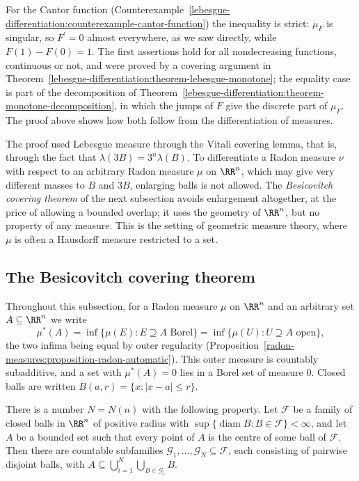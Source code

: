 For the Cantor function (Counterexample~\ref{lebesgue-differentiation:counterexample-cantor-function}) the inequality is strict: $\mu_F$ is singular, so $F^{\prime} = 0$ almost everywhere, as we saw directly,
while $F(1) - F(0) = 1$. The first assertions hold for all nondecreasing functions, continuous or not, and were proved by a covering argument in
Theorem~\ref{lebesgue-differentiation:theorem-lebesgue-monotone}; the equality case is part of the decomposition of Theorem~\ref{lebesgue-differentiation:theorem-monotone-decomposition}, in which the
jumps of $F$ give the discrete part of $\mu_F$. The proof above shows how both follow from the differentiation of measures.

\begin{remark}\label{radon-measures:remark-besicovitch}
The proof used Lebesgue measure through the Vitali covering lemma, that is, through the fact that $\lambda(3B) = 3^n\lambda(B)$. To differentiate a Radon measure $\nu$ with respect to an arbitrary Radon
measure $\mu$ on $\RR^n$, which may give very different masses to $B$ and $3B$, enlarging balls is not allowed. The \emph{Besicovitch covering theorem} of the next subsection avoids enlargement
altogether, at the price of allowing a bounded overlap; it uses the geometry of $\RR^n$, but no property of any measure. This is the setting of geometric measure theory, where $\mu$ is often a
Hausdorff measure restricted to a set.
\end{remark}

\subsection{The Besicovitch covering theorem}\label{radon-measures:subsection-besicovitch}

Throughout this subsection, for a Radon measure $\mu$ on $\RR^n$ and an arbitrary set $A \subseteq \RR^n$ we write
\[
\mu^*(A) = \inf\{\mu(E) : E \supseteq A \text{ Borel}\} = \inf\{\mu(U) : U \supseteq A \text{ open}\},
\]
the two infima being equal by outer regularity (Proposition~\ref{radon-measures:proposition-radon-automatic}). This outer measure is countably subadditive, and a set with $\mu^*(A) = 0$ lies in a
Borel set of measure $0$. Closed balls are written $\overline{B}(a, r) = \{x : |x - a| \leq r\}$.

\begin{theorem}\label{radon-measures:theorem-besicovitch}
There is a number $N = N(n)$ with the following property. Let $\mathcal{F}$ be a family of closed balls in $\RR^n$ of positive radius with $\sup\{\operatorname{diam}B : B \in \mathcal{F}\} < \infty$,
and let $A$ be a bounded set such that every point of $A$ is the centre of some ball of $\mathcal{F}$. Then there are countable subfamilies $\mathcal{G}_1, \ldots, \mathcal{G}_N \subseteq \mathcal{F}$, each
consisting of pairwise disjoint balls, with $A \subseteq \bigcup_{i=1}^N\bigcup_{B \in \mathcal{G}_i}B$.
\end{theorem}

